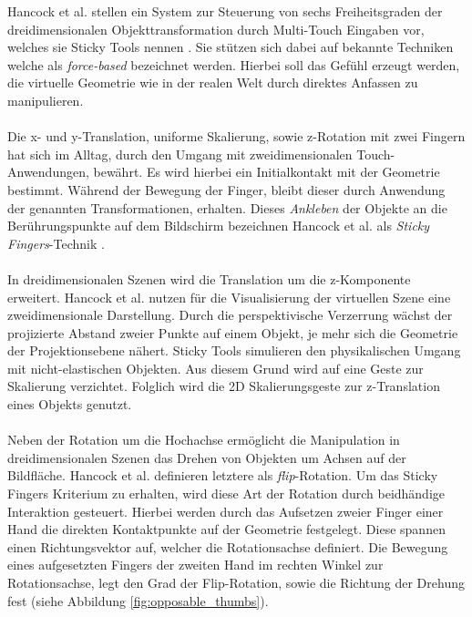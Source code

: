 Hancock et al. stellen ein System zur Steuerung von sechs Freiheitsgraden der dreidimensionalen Objekttransformation durch Multi-Touch Eingaben vor, welches sie Sticky Tools nennen \cite{hancock:2009}. Sie stützen sich dabei auf bekannte Techniken welche als \emph{force-based} bezeichnet werden. Hierbei soll das Gefühl erzeugt werden, die virtuelle Geometrie wie in der realen Welt durch direktes Anfassen zu manipulieren. 
\\\\
Die x- und y-Translation, uniforme Skalierung, sowie z-Rotation mit zwei Fingern hat sich im Alltag, durch den Umgang mit zweidimensionalen Touch-Anwendungen, bewährt. Es wird hierbei ein Initialkontakt mit der Geometrie bestimmt. Während der Bewegung der Finger, bleibt dieser durch Anwendung der genannten Transformationen, erhalten. Dieses \emph{Ankleben} der Objekte an die Berührungspunkte auf dem Bildschirm bezeichnen Hancock et al. als \emph{Sticky Fingers}-Technik \cite{hancock:2007,hancock:2009}.
\\\\
In dreidimensionalen Szenen wird die Translation um die z-Komponente erweitert. Hancock et al. nutzen für die Visualisierung der virtuellen Szene eine zweidimensionale Darstellung. Durch die perspektivische Verzerrung wächst der projizierte Abstand zweier Punkte auf einem Objekt, je mehr sich die Geometrie der Projektionsebene nähert. Sticky Tools simulieren den physikalischen Umgang mit nicht-elastischen Objekten. Aus diesem Grund wird auf eine Geste zur Skalierung verzichtet. Folglich wird die 2D Skalierungsgeste zur z-Translation eines Objekts genutzt.
\\\\
Neben der Rotation um die Hochachse ermöglicht die Manipulation in dreidimensionalen Szenen das Drehen von Objekten um Achsen auf der Bildfläche. Hancock et al. definieren letztere als \emph{flip}-Rotation. Um das Sticky Fingers Kriterium zu erhalten, wird diese Art der Rotation durch beidhändige Interaktion gesteuert. Hierbei werden durch das Aufsetzen zweier Finger einer Hand die direkten Kontaktpunkte auf der Geometrie festgelegt. Diese spannen einen Richtungsvektor auf, welcher die Rotationsachse definiert. Die Bewegung eines aufgesetzten Fingers der zweiten Hand im rechten Winkel zur Rotationsachse, legt den Grad der Flip-Rotation, sowie die Richtung der Drehung fest (siehe Abbildung \ref{fig:opposable_thumbs}).

